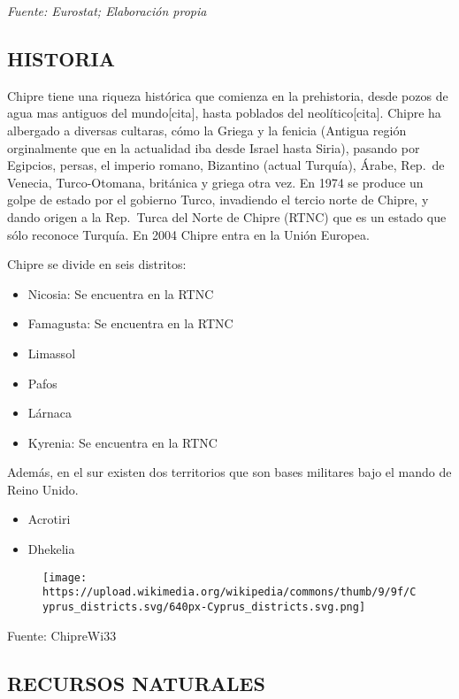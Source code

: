 \documentclass[11pt]{article}
\makeatletter
\def\maxwidth{\ifdim\Gin@nat@width>\linewidth\linewidth
    \else\Gin@nat@width\fi}
\let\Oldincludegraphics\includegraphics
\renewcommand{\includegraphics}[1]{\Oldincludegraphics[width=.8\maxwidth]{#1}}
\providecommand{\tightlist}{%
      \setlength{\itemsep}{0pt}\setlength{\parskip}{0pt}}
\makeatother
\begin{document}
    \emph{Fuente: Eurostat; Elaboración propia}

    \subsection{HISTORIA}\label{historia}

    Chipre tiene una riqueza histórica que comienza en la prehistoria, desde
pozos de agua mas antiguos del mundo{[}cita{]}, hasta poblados del
neolítico{[}cita{]}. Chipre ha albergado a diversas cultaras, cómo la
Griega y la fenicia (Antigua región orginalmente que en la actualidad
iba desde Israel hasta Siria), pasando por Egipcios, persas, el imperio
romano, Bizantino (actual Turquía), Árabe, Rep.~de Venecia,
Turco-Otomana, británica y griega otra vez. En 1974 se produce un golpe
de estado por el gobierno Turco, invadiendo el tercio norte de Chipre, y
dando origen a la Rep.~Turca del Norte de Chipre (RTNC) que es un estado
que sólo reconoce Turquía. En 2004 Chipre entra en la Unión Europea.

Chipre se divide en seis distritos:

\begin{itemize}
\tightlist
\item
  Nicosia: Se encuentra en la RTNC
\item
  Famagusta: Se encuentra en la RTNC
\item
  Limassol
\item
  Pafos
\item
  Lárnaca
\item
  Kyrenia: Se encuentra en la RTNC
\end{itemize}

Además, en el sur existen dos territorios que son bases militares bajo
el mando de Reino Unido.

\begin{itemize}
\tightlist
\item
  Acrotiri
\item
  Dhekelia
\end{itemize}

\begin{figure}
\centering
\texttt{[image: https://upload.wikimedia.org/wikipedia/commons/thumb/9/9f/Cyprus\_districts.svg/640px-Cyprus\_districts.svg.png]}
\caption{}
\end{figure}

Fuente: ChipreWi33

    \subsection{RECURSOS NATURALES}\label{recursos-naturales}
\end{document}
